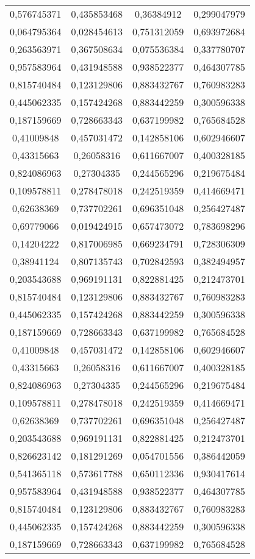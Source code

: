 \begin{longtable}{|c|c|c|c|}
0,576745371 & 0,435853468 & 0,36384912  & 0,299047979 \\
0,064795364 & 0,028454613 & 0,751312059 & 0,693972684 \\
0,263563971 & 0,367508634 & 0,075536384 & 0,337780707 \\
0,957583964 & 0,431948588 & 0,938522377 & 0,464307785 \\
0,815740484 & 0,123129806 & 0,883432767 & 0,760983283 \\
0,445062335 & 0,157424268 & 0,883442259 & 0,300596338 \\
0,187159669 & 0,728663343 & 0,637199982 & 0,765684528 \\
0,41009848  & 0,457031472 & 0,142858106 & 0,602946607 \\
0,43315663  & 0,26058316  & 0,611667007 & 0,400328185 \\
0,824086963 & 0,27304335  & 0,244565296 & 0,219675484 \\
0,109578811 & 0,278478018 & 0,242519359 & 0,414669471 \\
0,62638369  & 0,737702261 & 0,696351048 & 0,256427487 \\
0,69779066  & 0,019424915 & 0,657473072 & 0,783698296 \\
0,14204222  & 0,817006985 & 0,669234791 & 0,728306309 \\
0,38941124  & 0,807135743 & 0,702842593 & 0,382494957 \\
0,203543688 & 0,969191131 & 0,822881425 & 0,212473701 \\
0,815740484 & 0,123129806 & 0,883432767 & 0,760983283 \\
0,445062335 & 0,157424268 & 0,883442259 & 0,300596338 \\
0,187159669 & 0,728663343 & 0,637199982 & 0,765684528 \\
0,41009848  & 0,457031472 & 0,142858106 & 0,602946607 \\
0,43315663  & 0,26058316  & 0,611667007 & 0,400328185 \\
0,824086963 & 0,27304335  & 0,244565296 & 0,219675484 \\
0,109578811 & 0,278478018 & 0,242519359 & 0,414669471 \\
0,62638369  & 0,737702261 & 0,696351048 & 0,256427487 \\
0,203543688 & 0,969191131 & 0,822881425 & 0,212473701 \\
0,826623142 & 0,181291269 & 0,054701556 & 0,386442059 \\
0,541365118 & 0,573617788 & 0,650112336 & 0,930417614 \\
0,957583964 & 0,431948588 & 0,938522377 & 0,464307785 \\
0,815740484 & 0,123129806 & 0,883432767 & 0,760983283 \\
0,445062335 & 0,157424268 & 0,883442259 & 0,300596338 \\
0,187159669 & 0,728663343 & 0,637199982 & 0,765684528 \\
\end{longtable}

